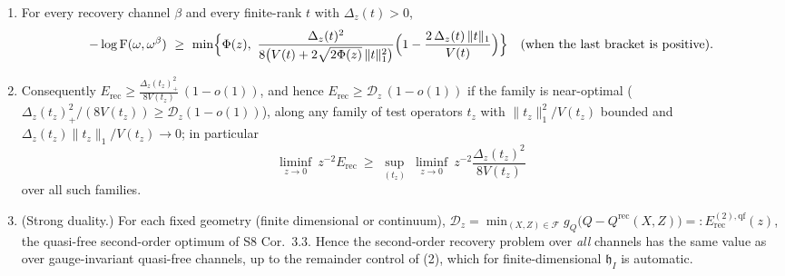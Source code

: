 \documentclass[11pt,a4paper]{article}
\newcommand{\Erec}{E_{\mathrm{rec}}}\newcommand{\Krec}{\mathcal K_{\mathrm{rec}}}
\newcommand{\hh}{\mathfrak h}\newcommand{\Var}{\operatorname{Var}}
\begin{document}
\begin{theorem}\label{thm:main}
\begin{enumerate}[leftmargin=1.6em,itemsep=1pt]
\item For every recovery channel \(\beta\) and every finite-rank \(t\) with \(\Delta_z(t)>0\),
\[
 -\log\Fid(\omega,\omega^\beta)\ \ge\ \min\Bigl\{\Phi(z),\ 
 \frac{\Delta_z(t)^2}{8\bigl(V(t)+2\sqrt{2\Phi(z)}\,\|t\|_1^2\bigr)}
 \Bigl(1-\frac{2\,\Delta_z(t)\,\|t\|_1}{V(t)}\Bigr)\Bigr\}
 \quad\text{(when the last bracket is positive)}.
\]
\item Consequently \(\Erec\ge\frac{\Delta_z(t_z)_+^2}{8V(t_z)}\,(1-o(1))\), and hence \(\Erec\ge\mathcal D_z\,(1-o(1))\) if the family is near-optimal (\(\Delta_z(t_z)_+^2/(8V(t_z))\ge\mathcal D_z(1-o(1))\)), along any family of test operators
\(t_z\) with \(\|t_z\|_1^2/V(t_z)\) bounded and \(\Delta_z(t_z)\|t_z\|_1/V(t_z)\to0\); in particular
\begin{equation}\label{eq:liminf}
 \liminf_{z\to0}\ z^{-2}\Erec\ \ge\ \sup_{(t_z)}\ \liminf_{z\to0}\ z^{-2}\frac{\Delta_z(t_z)^2}{8V(t_z)}
\end{equation}
over all such families.
\item (Strong duality.)  For each fixed geometry (finite dimensional or continuum),
\(\mathcal D_z=\min_{(X,Z)\in\mathcal F}g_Q\bigl(Q-Q^{\mathrm{rec}}(X,Z)\bigr)=:\Erec^{(2),\mathrm{qf}}(z)\),
the quasi-free second-order optimum of S8 Cor.~3.3.  Hence the second-order recovery problem
over \emph{all} channels has the same value as over gauge-invariant quasi-free channels, up to the
remainder control of (2), which for finite-dimensional \(\hh_I\) is automatic.
\end{enumerate}
\end{theorem}
\end{document}

